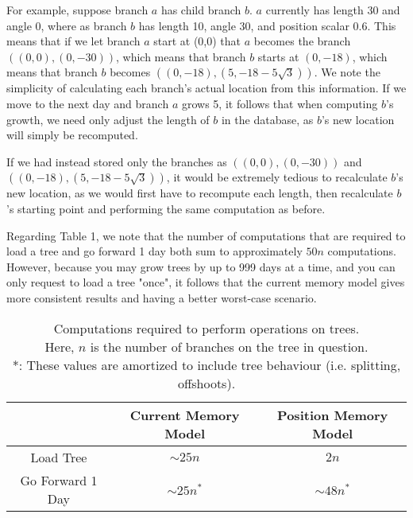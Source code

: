 For example, suppose branch $a$ has child branch $b$. $a$ currently has length 30 and angle 0, where as branch $b$ has length 10, angle 30, and position scalar 0.6. This means that if we let branch $a$ start at (0,0) that $a$ becomes the branch $((0,0),(0,-30))$, which means that branch $b$ starts at $(0,-18)$, which means that branch $b$ becomes $((0,-18),(5,-18-5\sqrt{3}))$. We note the simplicity of calculating each branch's actual location from this information. If we move to the next day and branch $a$ grows 5, it follows that when computing $b$'s growth, we need only adjust the length of $b$ in the database, as $b$'s new location will simply be recomputed.

If we had instead stored only the branches as $((0,0),(0,-30))$ and $((0,-18),(5,-18-5\sqrt{3}))$, it would be extremely tedious to recalculate $b$'s new location, as we would first have to recompute each length, then recalculate $b$'s starting point and performing the same computation as before.

Regarding Table 1, we note that the number of computations that are required to load a tree and go forward 1 day both sum to approximately $50n$ computations. However, because you may grow trees by up to 999 days at a time, and you can only request to load a tree "once", it follows that the current memory model gives more consistent results and having a better worst-case scenario.

\bigskip
\begin{table}
\begin{tabular}[t]{
c c c
}
    \toprule
     & Current Memory Model & Position Memory Model \\
     \midrule
     Load Tree & $\sim25n$ & $2n$ \\
     Go Forward 1 Day & $\sim25n^*$  & $\sim48n^*$ \\
     \bottomrule
\end{tabular}
\centering
\caption{Computations required to perform operations on trees. \\Here, $n$ is the number of branches on the tree in question. \\\footnotesize{*: These values are amortized to include tree behaviour (i.e. splitting, offshoots).} }
\end{table}
